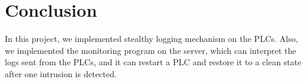 
\section{Conclusion}

In this project, we implemented stealthy logging mechanism on the PLCs. Also, we implemented the monitoring program on the server, which can interpret the logs sent from the PLCs, and it can restart a PLC and restore it to a clean state after one intrusion is detected. 
